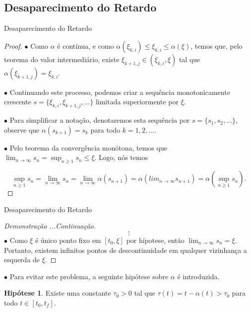 \documentclass{beamer}
\theoremstyle{plain}
\theoremstyle{definition}
\newtheorem{hip}{Hipótese}
\begin{document}

\subsection{Desaparecimento do Retardo}
\begin{frame}{Desaparecimento do Retardo}
    \small

    \begin{proof}
        $\bullet$ Como $\alpha$ é contínua, e como $\alpha(\xi_{k,i}) \leq \xi_{k, i} \leq  \alpha(\xi)$, temos que, pelo teorema do valor intermediário, existe $\xi_{k+1, j} \in (\xi_{k,i}, \xi)$ tal que $\alpha(\xi_{k+1, j}) = \xi_{k,i}$. 

        $\bullet$ Continuando este processo, podemos criar a sequência monotonicamente crescente $s = \{\xi_{k, i}, \xi_{k+1, j}, ...\}$ limitada superiormente por $\xi$. 

        $\bullet$ Para simplificar a notação, denotaremos esta sequência por $s = \{ s_1, s_2, \dots \}$, observe que $\alpha(s_{k+1}) = s_k$ para todo $k = 1, 2, \dots$. 

        $\bullet$ Pelo teorema da convergência monótona, temos que $\lim_{n \to \infty} s_n = \sup_{n \geq 1} s_n \leq \xi$. Logo, nós temos

        \noindent
        \[
            \sup_{n \geq 1} s_n = \lim_{n \to \infty} s_n  = 
            \lim_{n \to \infty} \alpha(s_{n+1}) = 
            \alpha(lim_{n \to \infty} s_{n+1}) = 
            \alpha\left(\sup_{n \geq 1} s_n \right).
        \]

    \renewcommand{\qedsymbol}{}

    \end{proof}
\end{frame}


\begin{frame}{Desaparecimento do Retardo}


    \begin{proof}[Demonstração ...Continuação]
        \[
            \vdots
        \]
        $\bullet$ Como $\xi$ é único ponto fixo em $[t_0, \xi]$ por hípotese, então $\lim_{n \to \infty} s_n = \xi$. Portanto, existem infinitos pontos de descontinuidade em qualquer vizinhança a esquerda de $\xi$.
    \end{proof}

    $\bullet$ Para evitar este problema, a seguinte hipótese sobre $\alpha$ é introduzida.

    \begin{hip}
        Existe uma constante $ \tau_0 > 0 $ tal que $ \tau(t) = t - \alpha(t) > \tau_0 $ para todo $ t \in [t_0, t_f] $.
        \label{H1:hipotese:hypothesis}
    \end{hip}


\end{frame}
\end{document}
